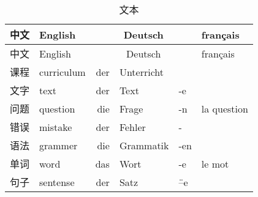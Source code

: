 \documentclass[12pt,A4paper,oneside,reqno]{amsart}
\numberwithin{equation}{section}
\theoremstyle{plain}
\theoremstyle{plain}
\theoremstyle{plain}
\numberwithin{equation}{section}
\theoremstyle{remark}
\begin{document}
\begin{longtable}{c|l|rll|l}
	\hline
中文	&	English	&\multicolumn{3}{c|}{Deutsch} &	français  	\\
	
	
	
	\hline
	\endhead
	\hline
中文	&	English	&\multicolumn{3}{c|}{Deutsch} &	français  	\\
	
	
	
	\hline
	\endfirsthead	
	\hline
	\endfoot
	\hline		
	\caption{文本}
	\endlastfoot				
	
课程	&	curriculum	&	der	&	Unterricht	&		&		\\
文字	&	text	&	der	&	Text	&	-e	&		\\
问题	&	question	&	die	&	Frage	&	-n	&	la question	\\
错误	&	mistake	&	der	&	Fehler	&	-	&		\\
语法	&	grammer	&	die	&	Grammatik	&	-en	&		\\
单词	&	word	&	das	&	Wort	&	-e	&	le mot	\\
句子	&	sentense	&	der	&	Satz	&	\"{--}e	&		\\


	
	
	
\end{longtable}
\end{document}
